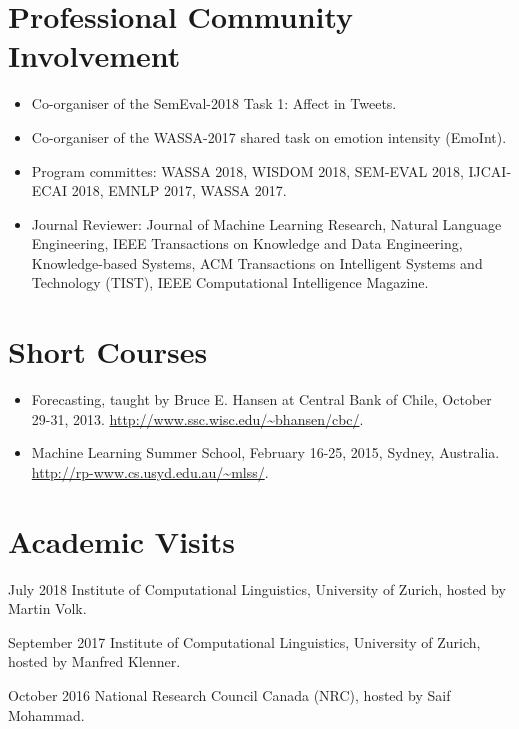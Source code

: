 \documentclass[letterpaper]{article}
\begin{document}
\section{Professional Community Involvement}
\begin{itemize}
  \item Co-organiser of the SemEval-2018 Task 1: Affect in Tweets.
  \item Co-organiser of the WASSA-2017 shared task on emotion intensity (EmoInt).
  \item Program committes: WASSA 2018, WISDOM 2018, SEM-EVAL 2018, IJCAI-ECAI 2018, EMNLP 2017, WASSA 2017.
  \item Journal Reviewer:  Journal of Machine Learning Research, Natural Language Engineering, IEEE Transactions on Knowledge and Data Engineering, Knowledge-based Systems, ACM Transactions on Intelligent Systems and Technology (TIST), IEEE Computational Intelligence Magazine.
 \end{itemize}
 
\section{Short Courses}
\begin{itemize}
 \item Forecasting, taught by Bruce E. Hansen at Central Bank of Chile, October 29-31, 2013. \url{http://www.ssc.wisc.edu/~bhansen/cbc/}.
 \item Machine Learning Summer School, February 16-25, 2015, Sydney, Australia. \url{http://rp-www.cs.usyd.edu.au/~mlss/}.
 \end{itemize} 
 
\section{Academic Visits}
\begin{CV}
\item [July 2018] Institute of Computational Linguistics, University of Zurich, hosted by Martin Volk.
\item [September 2017] Institute of Computational Linguistics, University of Zurich, hosted by Manfred Klenner.
\item [October 2016] National Research Council Canada (NRC), hosted by Saif Mohammad.
\end{CV} 
 
 
\end{document}
